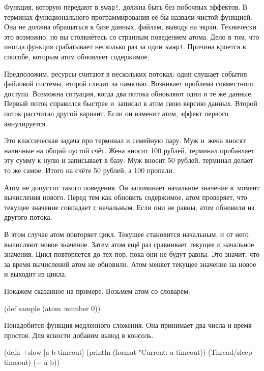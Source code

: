 Функция, которую передают в \verb|swap!|, должна быть без побочных эффектов. В
терминах функционального программирования её бы назвали чистой функцией. Она не
должна обращаться к базе данных, файлам, выводу на экран. Технически это
возможно, но вы столкнётесь со странным поведением атома. Дело в том, что иногда
функция срабатывает несколько раз за один \verb|swap!|. Причина кроется в
способе, которым атом обновляет содержимое.

Предположим, ресурсы считают в нескольких потоках: один слушает события файловой
системы, второй следит за памятью. Возникает проблема совместного
доступа. Возможна ситуация, когда два потока обновляют одни и те же
данные. Первый поток справился быстрее и~записал в атом свою версию
данных. Второй поток рассчитал другой вариант. Если он изменит атом, эффект
первого аннулируется.


Это классическая задача про терминал и семейную пару. Муж и~жена вносят наличные
на общий пустой счёт. Жена вносит 100 рублей, терминал прибавляет эту сумму к
нулю и записывает в базу. Муж вносит 50 рублей, терминал делает то же
самое. Итого на счёте 50 рублей, а 100 пропали.

Атом не допустит такого поведения. Он запоминает начальное значение в~момент
вычисления нового. Перед тем как обновить содержимое, атом проверяет, что
текущее значение совпадает с начальным. Если они не равны, атом обновили из
другого потока.

В этом случае атом повторяет цикл. Текущее становится начальным, и от него
вычисляют новое значение. Затем атом ещё раз сравнивает текущее и начальное
значения. Цикл повторяется до тех пор, пока они не будут равны. Это значит, что
за время вычислений атом не обновили. Атом меняет текущее значение на новое и
выходит из цикла.

Покажем сказанное на примере. Возьмем атом со словарём:

\begin{english}
  \begin{clojure}
(def sample (atom {:number 0}))
  \end{clojure}
\end{english}

Понадобится функция медленного сложения. Она принимает два числа и время
простоя. Для ясности добавим вывод в консоль.

\ifnarrow

\begin{english}
  \begin{clojure}
(defn +slow
  [a b timeout]
  (println
    (format "Current: %
      a timeout))
  (Thread/sleep timeout)
  (+ a b))
  \end{clojure}
\end{english}

